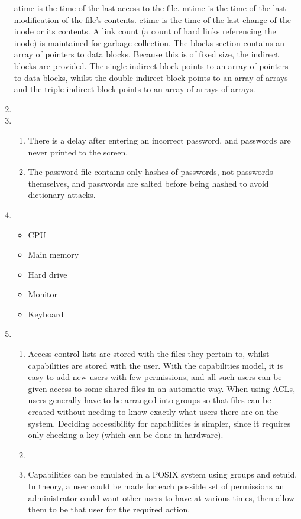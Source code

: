 \documentclass[11pt]{article}
\begin{document}
\begin{enumerate}
  atime is the time of the last access to the file. mtime is the time of the last modification of the file's contents. ctime is the time of the last change of the inode or its contents. A link count (a count of hard links referencing the inode) is maintained for garbage collection. The blocks section contains an array of pointers to data blocks. Because this is of fixed size, the indirect blocks are provided. The single indirect block points to an array of pointers to data blocks, whilst the double indirect block points to an array of arrays and the triple indirect block points to an array of arrays of arrays.
\item
\item
  \begin{enumerate}
  \item There is a delay after entering an incorrect password, and passwords are never printed to the screen.
  \item The password file contains only hashes of passwords, not passwords themselves, and passwords are salted before being hashed to avoid dictionary attacks.
  \end{enumerate}
\item
  \begin{itemize}
  \item CPU
  \item Main memory
  \item Hard drive
  \item Monitor
  \item Keyboard
  \end{itemize}
\item
  \begin{enumerate}
  \item Access control lists are stored with the files they pertain to, whilst capabilities are stored with the user. With the capabilities model, it is easy to add new users with few permissions, and all such users can be given access to some shared files in an automatic way. When using ACLs, users generally have to be arranged into groups so that files can be created without needing to know exactly what users there are on the system. Deciding accessibility for capabilities is simpler, since it requires only checking a key (which can be done in hardware).
  \item
  \item Capabilities can be emulated in a POSIX system using groups and setuid. In theory, a user could be made for each possible set of permissions an administrator could want other users to have at various times, then allow them to be that user for the required action.

\end{enumerate}
\end{enumerate}
\end{document}
